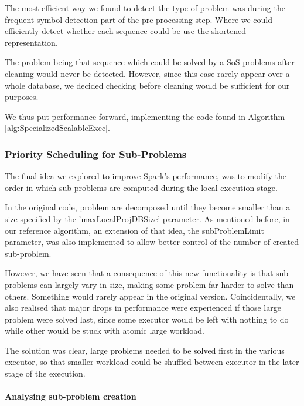\documentclass{eplmastersthesis}
\begin{document}
The most efficient way we found to detect the type of problem was during the frequent symbol detection part of the pre-processing step. Where we could efficiently detect whether each sequence could be use the shortened representation. \newline

The problem being that sequence which could be solved by a \acrlong{SoS} problems after cleaning would never be detected. However, since this case rarely appear over a whole database, we decided checking before cleaning would be sufficient for our purposes. \newline

We thus put performance forward, implementing the code found in Algorithm \ref{alg:SpecializedScalableExec}.

\subsubsection{Priority Scheduling for Sub-Problems}

The final idea we explored to improve Spark's performance, was to modify the order in which sub-problems are computed during the local execution stage. \newline

In the original code, problem are decomposed until they become smaller than a size specified by the 'maxLocalProjDBSize' parameter. As mentioned before, in our reference algorithm, an extension of that idea, the subProblemLimit parameter, was also implemented to allow better control of the number of created sub-problem. \newline

However, we have seen that a consequence of this new functionality is that sub-problems can largely vary in size, making some problem far harder to solve than others. Something would rarely appear in the original version. Coincidentally, we also realised that major drops in performance were experienced if those large problem were solved last, since some executor would be left with nothing to do while other would be stuck with atomic large workload.
\newline

The solution was clear, large problems needed to be solved first in the various executor, so that smaller workload could be shuffled between executor in the later stage of the execution.

\paragraph{Analysing sub-problem creation}
\end{document}
